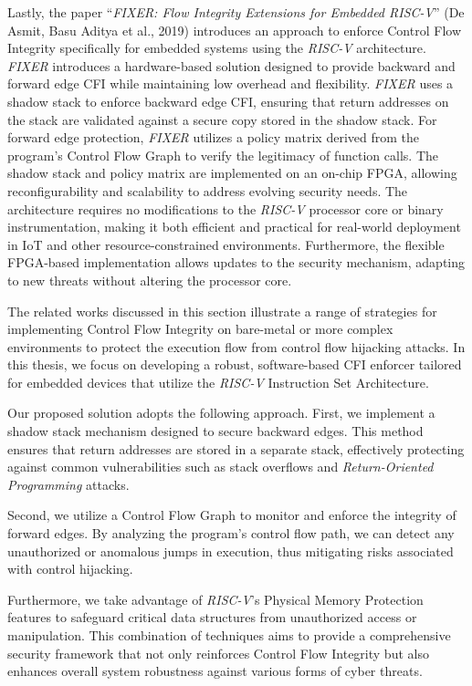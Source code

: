 Lastly, the paper ``\textit{FIXER: Flow Integrity Extensions for Embedded RISC-V}''
(De Asmit, Basu Aditya et al., 2019)\cite{Fixer} introduces an approach to
enforce Control Flow Integrity specifically for embedded systems using the
\textit{RISC-V} architecture. \textit{FIXER} introduces a hardware-based solution
designed to provide backward and forward edge CFI while maintaining low overhead
and flexibility. \textit{FIXER} uses a shadow stack to enforce backward edge CFI,
ensuring that return addresses on the stack are validated against a secure copy
stored in the shadow stack. For forward edge protection, \textit{FIXER} utilizes
a policy matrix derived from the program's Control Flow Graph to verify the legitimacy
of function calls. The shadow stack and policy matrix are implemented on an on-chip
FPGA, allowing reconfigurability and scalability to address evolving security needs.
The architecture requires no modifications to the \textit{RISC-V} processor core
or binary instrumentation, making it both efficient and practical for real-world
deployment in IoT and other resource-constrained environments. Furthermore, the
flexible FPGA-based implementation allows updates to the security mechanism, adapting
to new threats without altering the processor core.

The related works discussed in this section illustrate a range of strategies for
implementing Control Flow Integrity on bare-metal or more complex environments to
protect the execution flow from control flow hijacking attacks. In this thesis, we
focus on developing a robust, software-based CFI enforcer tailored for embedded
devices that utilize the \textit{RISC-V} Instruction Set Architecture.

Our proposed solution adopts the following approach. First, we implement a shadow
stack mechanism designed to secure backward edges. This method ensures that
return addresses are stored in a separate stack, effectively protecting against common
vulnerabilities such as stack overflows and \textit{Return-Oriented Programming}
attacks.

Second, we utilize a Control Flow Graph to monitor and enforce the integrity of forward
edges. By analyzing the program's control flow path, we can detect any unauthorized
or anomalous jumps in execution, thus mitigating risks associated with control
hijacking.

Furthermore, we take advantage of \textit{RISC-V}'s Physical Memory Protection
features to safeguard critical data structures from unauthorized access or
manipulation. This combination of techniques aims to provide a comprehensive security
framework that not only reinforces Control Flow Integrity but also enhances overall
system robustness against various forms of cyber threats.
